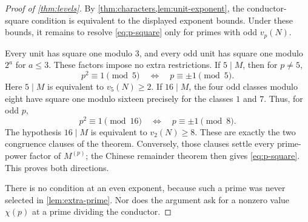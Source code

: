 \begin{proof}[Proof of \cref{thm:levels}]
By \cref{thm:characters,lem:unit-exponent}, the conductor-square
condition is equivalent to the displayed exponent bounds.
Under these bounds, it remains to resolve
\eqref{eq:p-square} only for primes with odd \(v_p(N)\).

Every unit has square one modulo \(3\), and every odd unit has
square one modulo \(2^a\) for \(a\le3\). These factors impose no
extra restrictions. If \(5\mid M\), then for \(p\ne5\),
\[
 p^2\equiv1\pmod5
 \quad\Longleftrightarrow\quad p\equiv\pm1\pmod5.
\]
Here \(5\mid M\) is equivalent to \(v_5(N)\ge2\). If
\(16\mid M\), the four odd classes modulo eight have square
one modulo sixteen precisely for the classes \(1\) and \(7\).
Thus, for odd \(p\),
\[
 p^2\equiv1\pmod{16}
 \quad\Longleftrightarrow\quad p\equiv\pm1\pmod8.
\]
The hypothesis \(16\mid M\) is equivalent to \(v_2(N)\ge8\).
These are exactly the two congruence clauses of the theorem.
Conversely, those clauses settle every prime-power factor
of \(M^{(p)}\); the Chinese remainder theorem then gives
\eqref{eq:p-square}. This proves both directions.

There is no condition at an even exponent, because such a
prime was never selected in \cref{lem:extra-prime}.
Nor does the argument ask for a nonzero value \(\chi(p)\)
at a prime dividing the conductor.
\end{proof}
